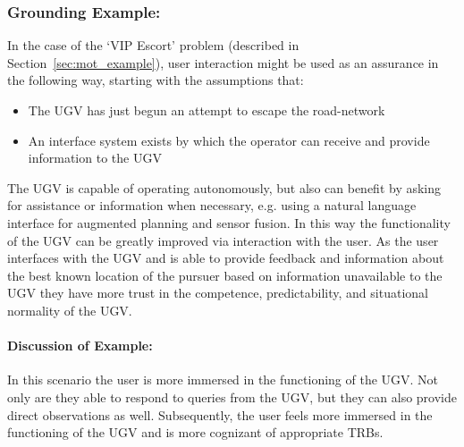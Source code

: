 \subsubsection{Grounding Example:}
In the case of the `VIP Escort' problem (described in Section~\ref{sec:mot_example}), user interaction might be used as an assurance in the following way, starting with the assumptions that:

\begin{itemize}
    \item The UGV has just begun an attempt to escape the road-network
    \item An interface system exists by which the operator can receive and provide information to the UGV
\end{itemize}

The UGV is capable of operating autonomously, but also can benefit by asking for assistance or information when necessary, e.g. using a natural language interface for augmented planning and sensor fusion. In this way the functionality of the UGV can be greatly improved via interaction with the user. As the user interfaces with the UGV and is able to provide feedback and information about the best known location of the pursuer based on information unavailable to the UGV they have more trust in the competence, predictability, and situational normality of the UGV.

\paragraph{\textbf{Discussion of Example:}} In this scenario the user is more immersed in the functioning of the UGV. Not only are they able to respond to queries from the UGV, but they can also provide direct observations as well. Subsequently, the user feels more immersed in the functioning of the UGV and is more cognizant of appropriate TRBs.
